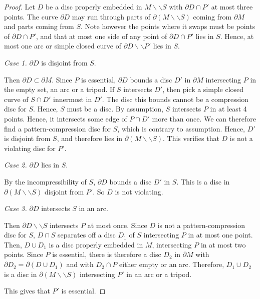 \documentclass[10pt,a4paper]{amsart}
\newcommand{\cut}{\backslash\backslash}
\begin{document}
\begin{proof}
Let $D$ be a disc properly embedded in $M \cut S$ with $\partial D \cap P'$ at most three points. The curve $\partial D$ may run through parts of $\partial (M \cut S)$ coming from $\partial M$ and parts coming from $S$. Note however the points where it swaps must be points of $\partial D \cap P'$, and that at most one side of any point of $\partial D \cap P'$ lies in $S$. Hence, at most one arc or simple closed curve of $\partial D \cut P'$ lies in $S$.

\medskip
\emph{Case 1.} $\partial D$ is disjoint from $S$.
\medskip

Then $\partial D \subset \partial M$. Since $P$ is essential, $\partial D$ bounds a disc $D'$ in $\partial M$ intersecting $P$ in the empty set, an arc or a tripod.
If $S$ intersects $D'$, then pick a simple closed curve of $S \cap D'$ innermost in $D'$. The disc this bounds cannot be a compression disc for $S$. Hence, $S$ must be a disc. By assumption, $S$ intersects $P$ in at least 4 points. Hence, it intersects some edge of $P \cap D'$ more than once. We can therefore find a pattern-compression disc for $S$, which is contrary to assumption. Hence, $D'$ is disjoint from $S$, and therefore lies in $\partial (M \cut S)$. This verifies that $D$ is not a violating disc for $P'$.

\medskip
\emph{Case 2.} $\partial D$ lies in $S$.
\medskip

By the incompressibility of $S$, $\partial D$ bounds a disc $D'$ in $S$. This is a disc in $\partial (M \cut S)$ disjoint from $P'$. So $D$ is not violating.

\medskip
\emph{Case 3.} $\partial D$ intersects $S$ in an arc.
\medskip

Then $\partial D \cut S$ intersects $P$ at most once. Since $D$ is not a pattern-compression disc for $S$, $D \cap S$ separates off a disc $D_1$ of $S$ intersecting $P$ in at most one point. Then, $D \cup D_1$ is a disc properly embedded in $M$, intersecting $P$ in at most two points. Since $P$ is essential, there is therefore a disc $D_2$ in $\partial M$ with $\partial D_2 = \partial (D \cup D_1)$ and with $D_2 \cap P$ either empty or an arc. Therefore, $D_1 \cup D_2$ is a disc in $\partial (M \cut S)$ intersecting $P'$ in an arc or a tripod. 

This gives that $P'$ is essential.
\end{proof}
\end{document}
